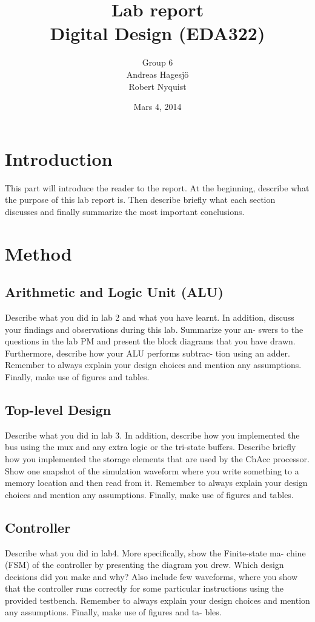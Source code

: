 \documentclass[a4paper]{article}
\title{\bf \LARGE Lab report\\
Digital Design (EDA322)}
\author{Group 6
\vspace{0.4cm}\\
Andreas Hagesjö \\ Robert Nyquist}
\date{Mars 4, 2014}
\begin{document}
\maketitle
\thispagestyle{empty}
\newpage
\tableofcontents
\thispagestyle{empty}
\newpage

\setcounter {page}{1}
\section{Introduction}
This part will introduce the reader to the report.
At the beginning, describe what the purpose of this lab report is. Then
describe briefly what each section discusses and finally summarize the most
important conclusions.

\section{Method}
\subsection{Arithmetic and Logic Unit (ALU)}
Describe what you did in lab 2 and what you have learnt. In addition,
discuss your findings and observations during this lab. Summarize your an-
swers to the questions in the lab PM and present the block diagrams that
you have drawn. Furthermore, describe how your ALU performs subtrac-
tion using an adder. Remember to always explain your design choices and
mention any assumptions. Finally, make use of figures and tables.
\subsection{Top-level Design}
Describe what you did in lab 3. In addition, describe how you implemented
the bus using the mux and any extra logic or the tri-state buffers. Describe
briefly how you implemented the storage elements that are used by the
ChAcc processor. Show one snapshot of the simulation waveform where you
write something to a memory location and then read from it. Remember to
always explain your design choices and mention any assumptions. Finally,
make use of figures and tables.
\subsection{Controller}
Describe what you did in lab4. More specifically, show the Finite-state ma-
chine (FSM) of the controller by presenting the diagram you drew. Which
design decisions did you make and why? Also include few waveforms, where
you show that the controller runs correctly for some particular instructions
using the provided testbench. Remember to always explain your design
choices and mention any assumptions. Finally, make use of figures and ta-
bles.
\end{document}
